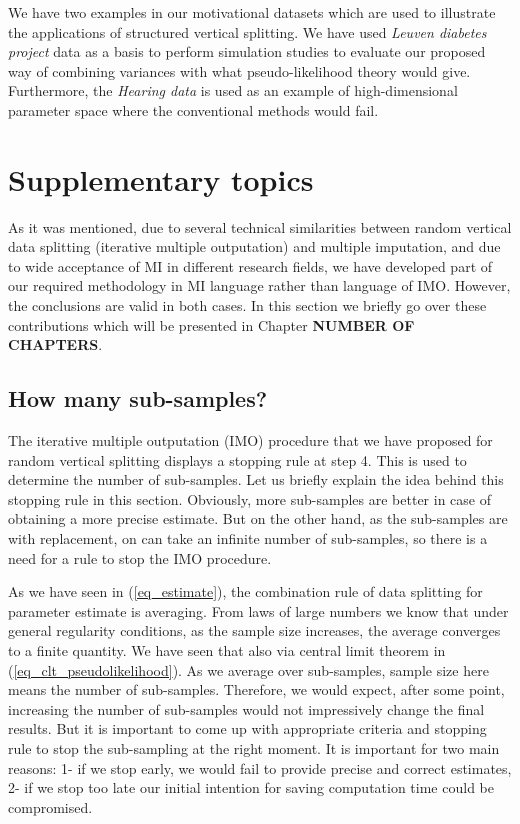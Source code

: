 \documentclass[11pt,a5paper,twoside]{book}
\begin{document}
We have two examples in our motivational datasets which are used to illustrate the applications of structured vertical splitting. We have used \emph{Leuven diabetes project} data as a basis to perform simulation studies to evaluate our proposed way of combining variances with what pseudo-likelihood theory would give. Furthermore, the \emph{Hearing data} is used as an example of high-dimensional parameter space where the conventional methods would fail. 


\section{Supplementary topics}

As it was mentioned, due to several technical similarities between random vertical data splitting (iterative multiple outputation) and multiple imputation, and due to wide acceptance of MI in different research fields, we have developed part of our required methodology in MI language rather than language of IMO. However, the conclusions are valid in both cases. In this section we briefly go over these contributions which will be presented in Chapter \textbf{NUMBER OF CHAPTERS}.

\subsection{How many sub-samples?}

The iterative multiple outputation (IMO) procedure that we have proposed for random vertical splitting displays a stopping rule at step 4. This is used to determine the number of sub-samples. Let us briefly explain the idea behind this stopping rule in this section. Obviously, more sub-samples are better in case of obtaining a more precise estimate. But on the other hand, as the sub-samples are with replacement, on can take an infinite number of sub-samples, so there is a need for a rule to stop the IMO procedure. 

As we have seen in (\ref{eq_estimate}), the combination rule of data splitting for parameter estimate is averaging. From laws of large numbers we know that under general regularity conditions, as the sample size increases, the average converges to a finite quantity. We have seen that also via central limit theorem in (\ref{eq_clt_pseudolikelihood}). As we average over sub-samples, sample size here means the number of sub-samples. Therefore, we would expect, after some point, increasing the number of sub-samples would not impressively change the final results. But it is important to come up with appropriate criteria and stopping rule to stop the sub-sampling at the right moment. It is important for two main reasons: 1- if we stop early, we would fail to provide precise and correct estimates, 2- if we stop too late our initial intention for saving computation time could be compromised.
\end{document}

